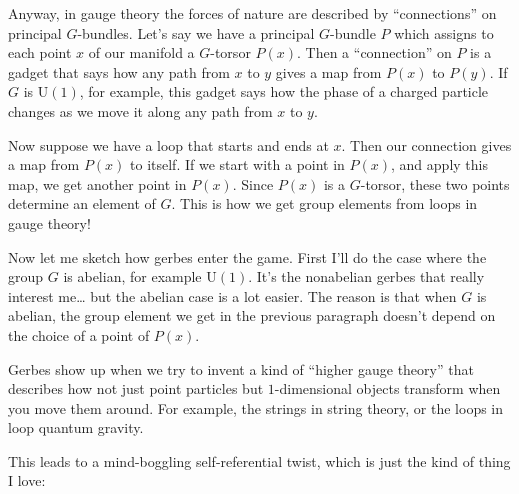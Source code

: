 \documentclass{article}
\begin{document}
Anyway, in gauge theory the forces of nature are described by
``connections'' on principal \(G\)-bundles. Let's say we have a
principal \(G\)-bundle \(P\) which assigns to each point \(x\) of our
manifold a \(G\)-torsor \(P(x)\). Then a ``connection'' on \(P\) is a
gadget that says how any path from \(x\) to \(y\) gives a map from
\(P(x)\) to \(P(y)\). If \(G\) is \(\mathrm{U}(1)\), for example, this
gadget says how the phase of a charged particle changes as we move it
along any path from \(x\) to \(y\).

Now suppose we have a loop that starts and ends at \(x\). Then our
connection gives a map from \(P(x)\) to itself. If we start with a point
in \(P(x)\), and apply this map, we get another point in \(P(x)\). Since
\(P(x)\) is a \(G\)-torsor, these two points determine an element of
\(G\). This is how we get group elements from loops in gauge theory!

Now let me sketch how gerbes enter the game. First I'll do the case
where the group \(G\) is abelian, for example \(\mathrm{U}(1)\). It's
the nonabelian gerbes that really interest me\ldots{} but the abelian
case is a lot easier. The reason is that when \(G\) is abelian, the
group element we get in the previous paragraph doesn't depend on the
choice of a point of \(P(x)\).

Gerbes show up when we try to invent a kind of ``higher gauge theory''
that describes how not just point particles but \(1\)-dimensional
objects transform when you move them around. For example, the strings in
string theory, or the loops in loop quantum gravity.

This leads to a mind-boggling self-referential twist, which is just the
kind of thing I love:
\end{document}
